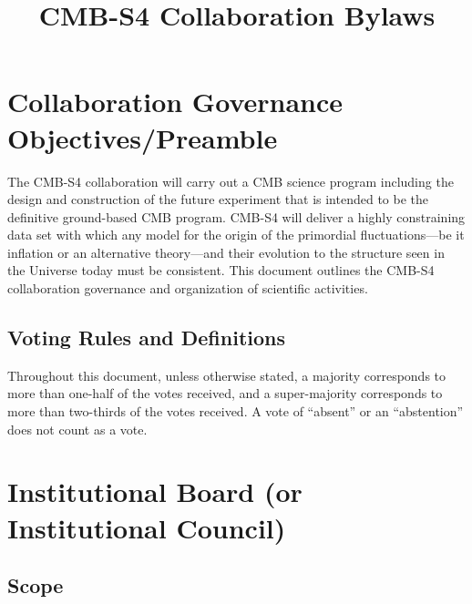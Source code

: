 \documentclass[12pt]{article}
\begin{document}
\title{CMB-S4 Collaboration Bylaws}
\maketitle

\tableofcontents

\section{Collaboration Governance Objectives/Preamble}

The CMB-S4 collaboration will carry out a CMB science program including the design and construction of the future experiment that is intended to be the definitive ground-based CMB program. CMB-S4 will deliver a highly constraining data set with which any model for the origin of the primordial fluctuations---be it inflation or an alternative theory---and their evolution to the structure seen in the Universe today must be consistent. This document outlines the CMB-S4 collaboration governance and organization of scientific activities.

\subsection{Voting Rules and Definitions}

Throughout this document, unless otherwise stated, a majority corresponds to more than one-half of the votes received, and a super-majority corresponds to more than two-thirds of the votes received. A vote of ``absent'' or an ``abstention'' does not count as a vote.

\section{Institutional Board (or Institutional Council)}

\subsection{Scope}
\end{document}
